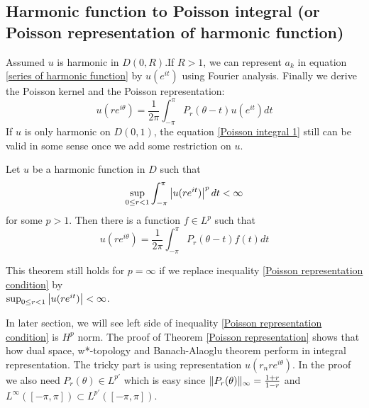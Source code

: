 \subsection{Harmonic function to Poisson integral (or Poisson representation of harmonic function)}\label{harmonic function can be written as Poisson integral}
Assumed $u$ is harmonic in $D(0,R). $If $R>1$, we can represent $a_k$ in equation \eqref{series of harmonic function} by $u(e^{i t})$ using Fourier analysis. Finally we derive the Poisson kernel and the Poisson representation:
\begin{equation}
    u(re^{i\theta})=\frac{1}{2\pi}\int_{-\pi}^\pi{P_r(\theta-t)u(e^{i t})}d t\label{Poisson integral 1}
\end{equation}
If $u$ is only harmonic on $D(0,1)$, the equation \eqref{Poisson integral 1} still can be valid in some sense once we add some restriction on $u$.
\begin{theorem}\label{Poisson representation}
    Let $u$ be a harmonic function in $D$ such that
    \begin{equation}\label{Poisson representation condition}
        \sup_{0\leq r<1}{\int_{-\pi}^{\pi}\left\lvert u(re^{i t})\right\rvert^p d t}<\infty
    \end{equation}
    for some $p>1$. Then there is a function $f\in L^p$ such that
    \begin{equation}
        u(re^{i\theta})=\frac{1}{2\pi}\int_{-\pi}^\pi{P_r(\theta-t)f(t)}d t
    \end{equation}
\end{theorem}
This theorem still holds for $p=\infty$ if we replace inequality \eqref{Poisson representation condition} by \\$\sup_{0\leq r<1}\left\lvert u(re^{i t})\right\rvert<\infty$.\par
In later section, we will see left side of inequality \eqref{Poisson representation condition} is $H^p$ norm. The proof of Theorem \ref{Poisson representation} shows
that how dual space, w*-topology and Banach-Alaoglu theorem perform in integral representation. The tricky part is using representation $u(r_nre^{i\theta})$.
In the proof we also need $P_r(\theta)\in L^{p'}$ which is easy since  $\lVert P_r(\theta)\rVert_\infty=\frac{1+r}{1-r}$ and $L^\infty([-\pi,\pi]) \subset L^{p'}([-\pi,\pi])$.\par

